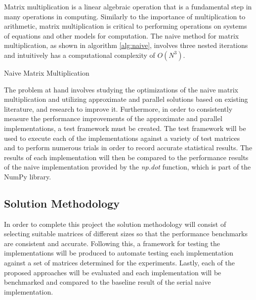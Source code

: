 \documentclass[oneside]{article}
\begin{document}
Matrix multiplication is a linear algebraic operation that is a fundamental step in many operations in computing. Similarly to the importance of multiplication to arithmetic, matrix multiplication is critical to performing operations on systems of equations and other models for computation. The naive method for matrix multiplication, as shown in algorithm \ref{alg:naive}, involves three nested iterations and intuitively has a computational complexity of $O(N^{3})$.

\begin{algorithm}[!ht]
  \SetAlgoNoLine
  \DontPrintSemicolon
  
\caption{Naive Matrix Multiplication}
\label{alg:naive}
\end{algorithm}


The problem at hand involves studying the optimizations of the naive matrix multiplication and utilizing approximate and parallel solutions based on existing literature, and research to improve it. Furthermore, in order to consistently measure the performance improvements of the approximate and parallel implementations, a test framework must be created. The test framework will be used to execute each of the implementations against a variety of test matrices and to perform numerous trials in order to record accurate statistical results. The results of each implementation will then be compared to the performance results of the naive implementation provided by the \emph{np.dot} function, which is part of the NumPy library.




\subsection{Solution Methodology}

In order to complete this project the solution methodology will consist of selecting suitable matrices of different sizes so that the performance benchmarks are consistent and accurate. Following this, a framework for testing the implementations will be produced to automate testing each implementation against a set of matrices determined for the experiments. Lastly, each of the proposed approaches will be evaluated and each implementation will be benchmarked and compared to the baseline result of the serial naive implementation.
\end{document}
